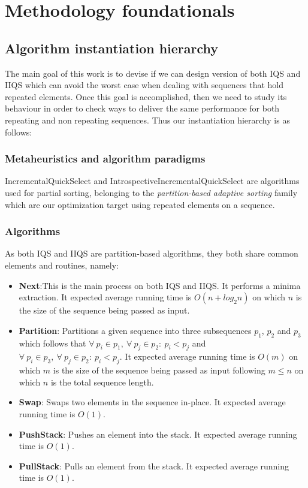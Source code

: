 \section{Methodology foundationals}
\label{SECTION:METHODOLOGY_FOUNDATIONALS}

\subsection{Algorithm instantiation hierarchy}
The main goal of this work is to devise if we can design version of both IQS and IIQS which can avoid the worst case when dealing with sequences that hold repeated elements. Once this goal is accomplished, then we need to study its behaviour in order to check ways to deliver the same performance for both repeating and non repeating sequences. Thus our instantiation hierarchy is as follows:

\subsubsection{Metaheuristics and algorithm paradigms}
IncrementalQuickSelect and IntrospectiveIncrementalQuickSelect are algorithms used for partial sorting, belonging to the \textit{partition-based adaptive sorting} family which are our optimization target using repeated elements on a sequence.

\subsubsection{Algorithms}
As both IQS and IIQS are partition-based algorithms, they both share common elements and routines, namely:

\begin{itemize}
    \item \textbf{Next}:This is the main process on both IQS and IIQS. It performs a minima extraction. It expected average running time is $O(n + log_2{n})$ on which $n$ is the size of the sequence being passed as input.
    \item \textbf{Partition}: Partitions a given sequence into three subsequences $p_1$, $p_2$ and $p_3$ which follows that $\forall~p_i \in p_1,~\forall~p_j \in p_2:~ p_i < p_j$ and $\forall~p_i \in p_3,~\forall~p_j \in p_2:~p_i < p_j$. It expected average running time is $O(m)$ on which $m$ is the size of the sequence being passed as input following $m \leq n$ on which $n$ is the total sequence length.
    \item \textbf{Swap}: Swaps two elements in the sequence in-place. It expected average running time is $O(1)$.
    \item \textbf{PushStack}: Pushes an element into the stack. It expected average running time is $O(1)$.
    \item \textbf{PullStack}: Pulls an element from the stack. It expected average running time is $O(1)$.
\end{itemize}

